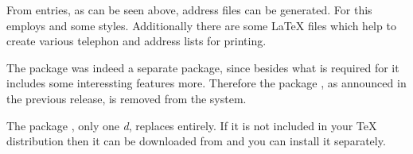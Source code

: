 From entries, as can be seen above, address files can be generated.  For this
 employs \BibTeX{} and some \BibTeX{} styles.  Additionally
there are some \LaTeX{} files which help to create various telephon and
address lists for printing.

The package  was indeed a separate package, since besides
what is required for \KOMAScript{} it includes some interessting features
more.  Therefore the package , as announced in the previous
\KOMAScript{} release, is removed from the \KOMAScript{} system.

The package , only one \emph{d}, replaces 
entirely.  If it is not included in your \TeX{} distribution then it can be
downloaded from \cite{package:adrconv} and you can install it separately.

